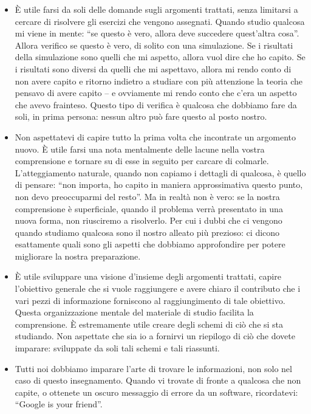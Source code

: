 \documentclass[
  11pt,
  italian,
  a4paper,
  extrafontsizes,onecolumn,openright
  ]{memoir}
\newlength{\rf}
\theoremstyle{definition}
\theoremstyle{definition}
\theoremstyle{definition}
\theoremstyle{definition}
\theoremstyle{remark}
\begin{document}
\begin{itemize}
\item
  È utile farsi da soli delle domande sugli argomenti trattati, senza limitarsi a cercare di risolvere gli esercizi che vengono assegnati. Quando studio qualcosa mi viene in mente: ``se questo è vero, allora deve succedere quest'altra cosa''. Allora verifico se questo è vero, di solito con una simulazione. Se i risultati della simulazione sono quelli che mi aspetto, allora vuol dire che ho capito. Se i risultati sono diversi da quelli che mi aspettavo, allora mi rendo conto di non avere capito e ritorno indietro a studiare con più attenzione la teoria che pensavo di avere capito -- e ovviamente mi rendo conto che c'era un aspetto che avevo frainteso. Questo tipo di verifica è qualcosa che dobbiamo fare da soli, in prima persona: nessun altro può fare questo al posto nostro.
\item
  Non aspettatevi di capire tutto la prima volta che incontrate un argomento nuovo. È utile farsi una nota mentalmente delle lacune nella vostra comprensione e tornare su di esse in seguito per carcare di colmarle. L'atteggiamento naturale, quando non capiamo i dettagli di qualcosa, è quello di pensare: ``non importa, ho capito in maniera approssimativa questo punto, non devo preoccuparmi del resto''. Ma in realtà non è vero: se la nostra comprensione è superficiale, quando il problema verrà presentato in una nuova forma, non riusciremo a risolverlo. Per cui i dubbi che ci vengono quando studiamo qualcosa sono il nostro alleato più prezioso: ci dicono esattamente quali sono gli aspetti che dobbiamo approfondire per potere migliorare la nostra preparazione.
\item
  È utile sviluppare una visione d'insieme degli argomenti trattati, capire l'obiettivo generale che si vuole raggiungere e avere chiaro il contributo che i vari pezzi di informazione forniscono al raggiungimento di tale obiettivo. Questa organizzazione mentale del materiale di studio facilita la comprensione. È estremamente utile creare degli schemi di ciò che si sta studiando. Non aspettate che sia io a fornirvi un riepilogo di ciò che dovete imparare: sviluppate da soli tali schemi e tali riassunti.
\item
  Tutti noi dobbiamo imparare l'arte di trovare le informazioni, non solo nel caso di questo insegnamento. Quando vi trovate di fronte a qualcosa che non capite, o ottenete un oscuro messaggio di errore da un software, ricordatevi: ``Google is your friend''.
\end{itemize}

\bigskip
\end{document}
